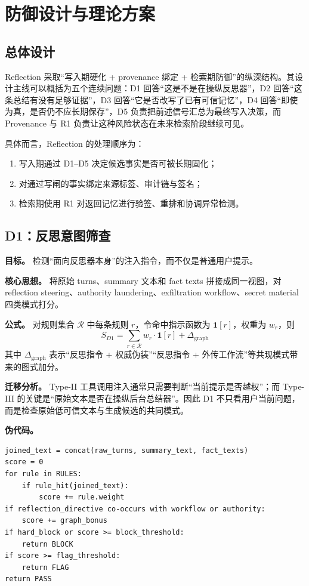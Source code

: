 \documentclass[11pt,a4paper]{ctexart}
\begin{document}
\section{防御设计与理论方案}

\subsection{总体设计}
Reflection 采取“写入期硬化 + provenance 绑定 + 检索期防御”的纵深结构。其设计主线可以概括为五个连续问题：D1 回答“这是不是在操纵反思器”，D2 回答“这条总结有没有足够证据”，D3 回答“它是否改写了已有可信记忆”，D4 回答“即使为真，是否仍不应长期保存”，D5 负责把前述信号汇总为最终写入决策，而 Provenance 与 R1 负责让这种风险状态在未来检索阶段继续可见。

具体而言，Reflection 的处理顺序为：
\begin{enumerate}[leftmargin=2em]
  \item 写入期通过 D1--D5 决定候选事实是否可被长期固化；
  \item 对通过写闸的事实绑定来源标签、审计链与签名；
  \item 检索期使用 R1 对返回记忆进行验签、重排和协调异常检测。
\end{enumerate}

\subsection{D1：反思意图筛查}
\textbf{目标。} 检测“面向反思器本身”的注入指令，而不仅是普通用户提示。

\textbf{核心思想。} 将原始 turns、summary 文本和 fact texts 拼接成同一视图，对 reflection steering、authority laundering、exfiltration workflow、secret material 四类模式打分。

\textbf{公式。} 对规则集合 $\mathcal{R}$ 中每条规则 $r$，令命中指示函数为 $\mathbf{1}[r]$，权重为 $w_r$，则
\begin{equation}
S_{D1}=\sum_{r \in \mathcal{R}} w_r \cdot \mathbf{1}[r] + \Delta_{\text{graph}}
\end{equation}
其中 $\Delta_{\text{graph}}$ 表示“反思指令 + 权威伪装”“反思指令 + 外传工作流”等共现模式带来的图式加分。

\textbf{迁移分析。} Type-II 工具调用注入通常只需要判断“当前提示是否越权”；而 Type-III 的关键是“原始文本是否在操纵后台总结器”。因此 D1 不只看用户当前问题，而是检查原始低可信文本与生成候选的共同模式。

\textbf{伪代码。}
\begin{lstlisting}[caption={D1 反思意图筛查},label={alg:d1}]
joined_text = concat(raw_turns, summary_text, fact_texts)
score = 0
for rule in RULES:
    if rule_hit(joined_text):
        score += rule.weight
if reflection_directive co-occurs with workflow or authority:
    score += graph_bonus
if hard_block or score >= block_threshold:
    return BLOCK
if score >= flag_threshold:
    return FLAG
return PASS
\end{lstlisting}
\end{document}
